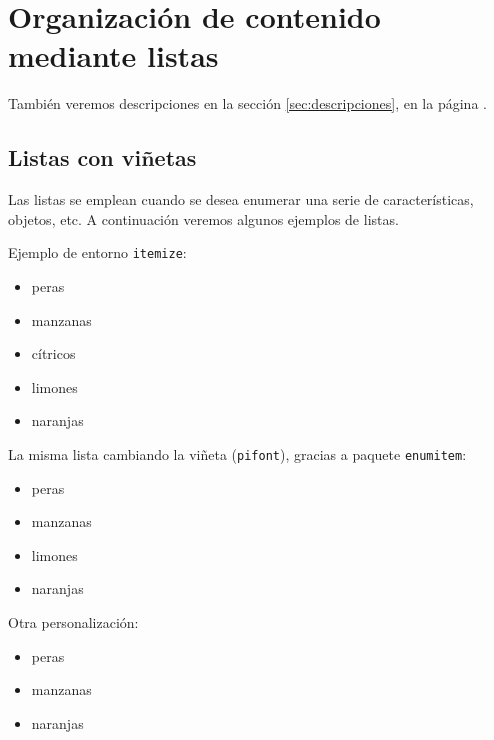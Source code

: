 \documentclass[11pt,a4paper]{article}
\begin{document}
\section{Organización de contenido mediante listas}
\label{sec:listas} %

También veremos descripciones en la sección \ref{sec:descripciones}, en la página \pageref{sec:descripciones}.

\subsection{Listas con viñetas}
Las listas se emplean cuando se desea enumerar una serie de características, objetos, etc. A continuación veremos algunos ejemplos de listas.

\noindent Ejemplo de entorno {\tt itemize}:

\begin{itemize}
	\item peras
	\item manzanas
    \item cítricos
        \item limones
        \item naranjas
\end{itemize}

\noindent La misma lista cambiando la viñeta (\texttt{pifont}), gracias a paquete \texttt{enumitem}:

\begin{itemize}[]
\item peras
\item[\faIcon{apple}] manzanas
\item limones
\item naranjas
\end{itemize}

\noindent Otra personalización:
\begin{itemize}[,noitemsep] %
	\item peras
	\item[\ding{55}] manzanas
	\item naranjas
\end{itemize}
\end{document}
